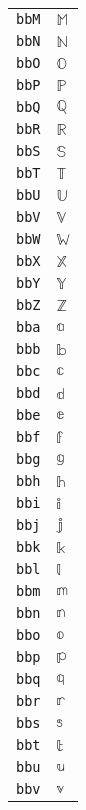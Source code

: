 \begin{longtable}{ll}
\texttt{bbM}&${}{\mathbb{M}}{}$\\
\texttt{bbN}&${}{\mathbb{N}}{}$\\
\texttt{bbO}&${}{\mathbb{O}}{}$\\
\texttt{bbP}&${}{\mathbb{P}}{}$\\
\texttt{bbQ}&${}{\mathbb{Q}}{}$\\
\texttt{bbR}&${}{\mathbb{R}}{}$\\
\texttt{bbS}&${}{\mathbb{S}}{}$\\
\texttt{bbT}&${}{\mathbb{T}}{}$\\
\texttt{bbU}&${}{\mathbb{U}}{}$\\
\texttt{bbV}&${}{\mathbb{V}}{}$\\
\texttt{bbW}&${}{\mathbb{W}}{}$\\
\texttt{bbX}&${}{\mathbb{X}}{}$\\
\texttt{bbY}&${}{\mathbb{Y}}{}$\\
\texttt{bbZ}&${}{\mathbb{Z}}{}$\\
\texttt{bba}&${}{\mathbb{a}}{}$\\
\texttt{bbb}&${}{\mathbb{b}}{}$\\
\texttt{bbc}&${}{\mathbb{c}}{}$\\
\texttt{bbd}&${}{\mathbb{d}}{}$\\
\texttt{bbe}&${}{\mathbb{e}}{}$\\
\texttt{bbf}&${}{\mathbb{f}}{}$\\
\texttt{bbg}&${}{\mathbb{g}}{}$\\
\texttt{bbh}&${}{\mathbb{h}}{}$\\
\texttt{bbi}&${}{\mathbb{i}}{}$\\
\texttt{bbj}&${}{\mathbb{j}}{}$\\
\texttt{bbk}&${}{\mathbb{k}}{}$\\
\texttt{bbl}&${}{\mathbb{l}}{}$\\
\texttt{bbm}&${}{\mathbb{m}}{}$\\
\texttt{bbn}&${}{\mathbb{n}}{}$\\
\texttt{bbo}&${}{\mathbb{o}}{}$\\
\texttt{bbp}&${}{\mathbb{p}}{}$\\
\texttt{bbq}&${}{\mathbb{q}}{}$\\
\texttt{bbr}&${}{\mathbb{r}}{}$\\
\texttt{bbs}&${}{\mathbb{s}}{}$\\
\texttt{bbt}&${}{\mathbb{t}}{}$\\
\texttt{bbu}&${}{\mathbb{u}}{}$\\
\texttt{bbv}&${}{\mathbb{v}}{}$\\

\end{longtable}
